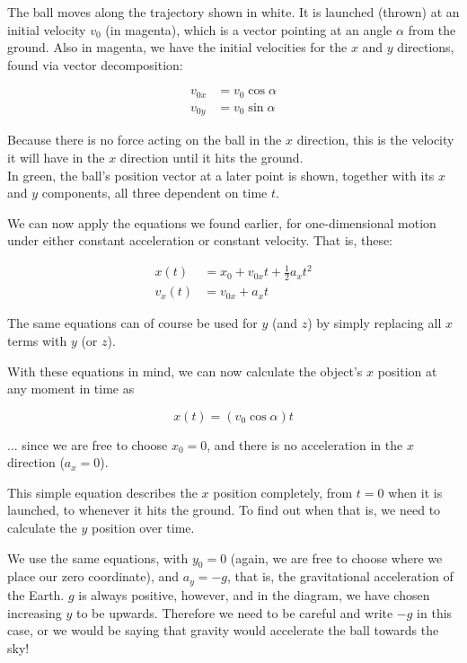 The ball moves along the trajectory shown in white. It is launched (thrown) at an initial velocity $v_0$ (in magenta), which is a vector pointing at an angle $\alpha$ from the ground. Also in magenta, we have the initial velocities for the $x$ and $y$ directions, found via vector decomposition:

\begin{align}
v_{0x} &= v_0 \cos \alpha\\
v_{0y} &= v_0 \sin \alpha
\end{align}

Because there is no force acting on the ball in the $x$ direction, this is the velocity it will have in the $x$ direction until it hits the ground.\\
In green, the ball's position vector at a later point is shown, together with its $x$ and $y$ components, all three dependent on time $t$.

We can now apply the equations we found earlier, for one-dimensional motion under either constant acceleration or constant velocity. That is, these:

\begin{align}
x(t) &= x_0 + v_{0x} t + \frac{1}{2} a_x t^2\\
v_x(t) &= v_{0x} + a_x t
\end{align}

The same equations can of course be used for $y$ (and $z$) by simply replacing all $x$ terms with $y$ (or $z$).

With these equations in mind, we can now calculate the object's $x$ position at any moment in time as

\begin{equation}
x(t) = (v_0 \cos \alpha) t
\end{equation}

... since we are free to choose $x_0 = 0$, and there is no acceleration in the $x$ direction ($a_x = 0$).

This simple equation describes the $x$ position completely, from $t=0$ when it is launched, to whenever it hits the ground. To find out when that is, we need to calculate the $y$ position over time.

We use the same equations, with $y_0 = 0$	 (again, we are free to choose where we place our zero coordinate), and $a_y = -g$, that is, the gravitational acceleration of the Earth. $g$ is always positive, however, and in the diagram, we have chosen increasing $y$ to be upwards. Therefore we need to be careful and write $-g$ in this case, or we would be saying that gravity would accelerate the ball towards the sky!

